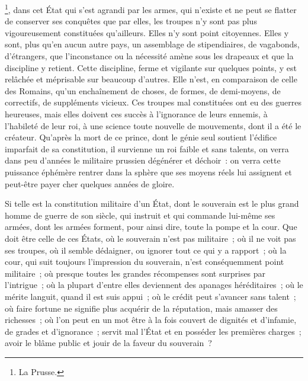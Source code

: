 \documentclass[french,twoside]{book} %
\begin{document}
\label{footnote1}\footnote{La Prusse.}, dans cet État qui s’est agrandi par les armes, qui n’existe et ne peut se flatter de conserver ses conquêtes que par elles, les troupes n’y sont pas plus vigoureusement constituées qu’ailleurs. Elles n’y sont point citoyennes. Elles y sont, plus qu’en aucun autre pays, un assemblage de stipendiaires, de vagabonds, d’étrangers, que l’inconstance ou la nécessité amène sous les drapeaux et que la discipline y retient. Cette discipline, ferme et vigilante sur quelques points, y est relâchée et méprisable sur beaucoup d’autres. Elle n’est, en comparaison de celle des Romains, qu’un enchaînement de choses, de formes, de demi-moyens, de correctifs, de suppléments vicieux. Ces troupes mal constituées ont eu des guerres heureuses, mais elles doivent ces succès à l’ignorance de leurs ennemis, à l’habileté de leur roi, à une science toute nouvelle de mouvements, dont il a été le créateur. Qu’après la mort de ce prince, dont le génie seul soutient l’édifice imparfait de sa constitution, il survienne un roi faible et sans talents, on verra dans peu d’années le militaire prussien dégénérer et déchoir : on verra cette puissance éphémère rentrer dans la sphère que ses moyens réels lui assignent et peut-être payer cher quelques années de gloire.\par
Si telle est la constitution militaire d’un État, dont le souverain est le plus grand homme de guerre de son siècle, qui instruit et qui commande lui-même ses armées, dont les armées forment, pour ainsi dire, toute la pompe et la cour. Que doit être celle de ces États, où le souverain n’est pas militaire ; où il ne voit pas ses troupes, où il semble dédaigner, ou ignorer tout ce qui y a rapport ; où la cour, qui suit toujours l’impression du souverain, n’est conséquemment point militaire ; où presque toutes les grandes récompenses sont surprises par l’intrigue ; où la plupart d’entre elles deviennent des apanages héréditaires ; où le mérite languit, quand il est suis appui ; où le crédit peut s’avancer sans talent ; où faire fortune ne signifie plus acquérir de la réputation, mais amasser des richesses ; où l’on peut en un mot être à la fois couvert de dignités et d’infamie, de grades et d’ignorance ; servit mal l’État et en posséder les premières charges ; avoir le blâme public et jouir de la faveur du souverain ?\par
\end{document}
